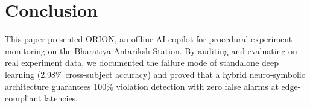\documentclass[journal,twocolumn]{IEEEtran}
\begin{document}
\section{Conclusion}
This paper presented ORION, an offline AI copilot for procedural experiment monitoring on the Bharatiya Antariksh Station. By auditing and evaluating on real experiment data, we documented the failure mode of standalone deep learning (2.98\% cross-subject accuracy) and proved that a hybrid neuro-symbolic architecture guarantees 100\% violation detection with zero false alarms at edge-compliant latencies.



\end{document}
